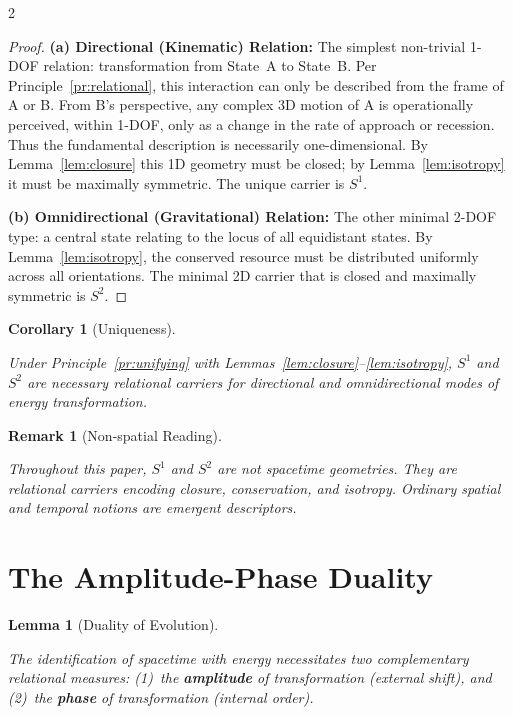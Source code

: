 \documentclass[10pt, a4paper]{article}
\newtheorem{lemma}[theorem]{Lemma}
\newtheorem{corollary}[theorem]{Corollary}
\newtheorem{remark}[theorem]{Remark}
\begin{document}
\begin{multicols}{2}
\begin{proof}
\textbf{(a) Directional (Kinematic) Relation:}
The simplest non-trivial 1-DOF relation: transformation from State~A to State~B. Per Principle~\ref{pr:relational}, this interaction can only be described from the frame of A or B. From B's perspective, any complex 3D motion of A is operationally perceived, within 1-DOF, only as a change in the rate of approach or recession. Thus the fundamental description is necessarily one-dimensional. By Lemma~\ref{lem:closure} this 1D geometry must be closed; by Lemma~\ref{lem:isotropy} it must be maximally symmetric. The unique carrier is $S^1$.

\textbf{(b) Omnidirectional (Gravitational) Relation:}
The other minimal 2-DOF type: a central state relating to the locus of all equidistant states. By Lemma~\ref{lem:isotropy}, the conserved resource must be distributed uniformly across all orientations. The minimal 2D carrier that is closed and maximally symmetric is $S^2$.
\end{proof}

\begin{corollary}[Uniqueness]
\hypertarget{cor:uniqueness}{}\label{cor:uniqueness}
Under Principle~\ref{pr:unifying} with Lemmas~\ref{lem:closure}--\ref{lem:isotropy}, $S^1$ and $S^2$ are \emph{necessary} relational carriers for directional and omnidirectional modes of energy transformation.
\end{corollary}

\begin{remark}[Non-spatial Reading]
\hypertarget{rem:nonspatial}{}\label{rem:nonspatial}
Throughout this paper, $S^1$ and $S^2$ are not spacetime geometries. They are relational carriers encoding closure, conservation, and isotropy. Ordinary spatial and temporal notions are emergent descriptors.
\end{remark}



\section{The Amplitude-Phase Duality}

\begin{lemma}[Duality of Evolution]
\hypertarget{lem:duality}{}\label{lem:duality}
The identification of spacetime with energy necessitates two complementary relational measures: (1)~the \textbf{amplitude} of transformation (external shift), and (2)~the \textbf{phase} of transformation (internal order).
\end{lemma}


\end{multicols}
\end{document}

